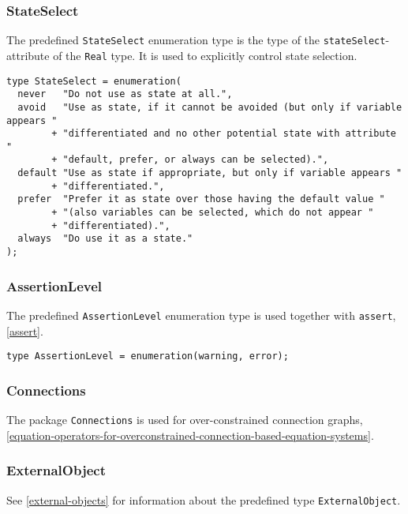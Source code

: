 \subsubsection{StateSelect}\label{stateselect}

The predefined \lstinline!StateSelect! enumeration type is the type of the \lstinline!stateSelect!-attribute of the \lstinline!Real! type.
It is used to explicitly control state selection.

\begin{lstlisting}[language=modelica]
type StateSelect = enumeration(
  never   "Do not use as state at all.",
  avoid   "Use as state, if it cannot be avoided (but only if variable appears "
        + "differentiated and no other potential state with attribute "
        + "default, prefer, or always can be selected).",
  default "Use as state if appropriate, but only if variable appears "
        + "differentiated.",
  prefer  "Prefer it as state over those having the default value "
        + "(also variables can be selected, which do not appear "
        + "differentiated).",
  always  "Do use it as a state."
);
\end{lstlisting}

\subsubsection{AssertionLevel}\label{assertionlevel}

The predefined \lstinline!AssertionLevel! enumeration type is used together with \lstinline!assert!, \cref{assert}.
\begin{lstlisting}[language=modelica]
type AssertionLevel = enumeration(warning, error);
\end{lstlisting}

\subsubsection{Connections}

The package \lstinline!Connections! is used for over-constrained connection graphs, \cref{equation-operators-for-overconstrained-connection-based-equation-systems}.

\subsubsection{ExternalObject}

See \cref{external-objects} for information about the predefined type \lstinline!ExternalObject!.

